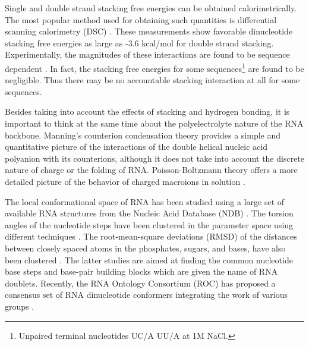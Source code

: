 Single  and  double strand  stacking  free  energies  can be  obtained
calorimetrically.  The most  popular  method used  for obtaining  such
quantities     is    differential    scanning     calorimetry    (DSC)
\cite{marky1982}.  These   measurements  show  favorable  dinucleotide
stacking free  energies as  large as -3.6  kcal/mol for  double strand
stacking.  Experimentally, the  magnitudes of  these  interactions are
found  to be  sequence dependent  \cite{bloomfield2000}. In  fact, the
stacking free  energies for some  sequences\footnote{Unpaired terminal
  nucleotides UC/A UU/A at 1M  NaCl.} are found to be negligible. Thus
there  may be  no accountable  stacking  interaction at  all for  some
sequences.

Besides  taking into  account  the effects  of  stacking and  hydrogen
bonding,  it  is  important  to  think  at the  same  time  about  the
polyelectrolyte  nature  of  the  RNA backbone.  Manning's  counterion
condensation theory \cite{manning1977,  manning2003} provides a simple
and  quantitative picture of  the interactions  of the  double helical
nucleic acid polyanion with its counterions, although it does not take
into account  the discrete  nature of charge  \cite{bloomfield2000} or
the folding  of RNA. Poisson-Boltzmann  theory offers a  more detailed
picture   of   the  behavior   of   charged   macroions  in   solution
\cite{antypov2005}.

The local conformational  space of RNA has been  studied using a large
set of available  RNA structures from the Nucleic  Acid Database (NDB)
\cite{berman1992}.  The torsion  angles of  the nucleotide  steps have
been  clustered  in the  parameter  space  using different  techniques
\cite{murray2003,  schneider2004}.   The  root-mean-square  deviations
(RMSD)  of   the  distances  between  closely  spaced   atoms  in  the
phosphates,   sugars,   and    bases,   have   also   been   clustered
\cite{sykes2005}. The  latter studies are aimed at  finding the common
nucleotide base  steps and base-pair  building blocks which  are given
the name of RNA doublets.  Recently, the RNA Ontology Consortium (ROC)
has  proposed   a  consensus   set  of  RNA   dinucleotide  conformers
integrating the work of various groups \cite{richardson2008}.


